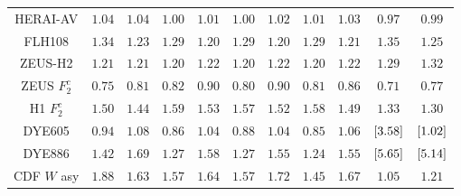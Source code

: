 \begin{tabular}{c||c|c||c|c||c|c||c|c||c|c}
 \hline
HERAI-AV            & $          1.04      $ & $          1.04      $  &  $          1.00      $  &  $          1.01      $  &  $         1.00      $ &  $         1.02      $ &  $          1.01      $  &  $          1.03      $  &  $          0.97      $  &  $          0.99      $  \\  
FLH108              & $          1.34      $ & $          1.23      $  &  $          1.29      $  &  $          1.20      $  &  $         1.29      $ &  $         1.20      $ &  $          1.29      $  &  $          1.21      $  &  $          1.35      $  &  $          1.25      $  \\  
ZEUS-H2             & $          1.21      $ & $          1.21      $  &  $          1.20      $  &  $          1.22      $  &  $         1.20      $ &  $         1.22      $ &  $          1.20      $  &  $          1.22      $  &  $          1.29      $  &  $          1.32      $  \\  
ZEUS $F_2^c$        & $          0.75      $ & $          0.81      $  &  $          0.82      $  &  $          0.90      $  &  $         0.80      $ &  $         0.90      $ &  $          0.81      $  &  $          0.86      $  &  $          0.71      $  &  $          0.77      $  \\  
H1 $F_2^c$          & $          1.50      $ & $          1.44      $  &  $          1.59      $  &  $          1.53      $  &  $         1.57      $ &  $         1.52      $ &  $          1.58      $  &  $          1.49      $  &  $          1.33      $  &  $          1.30      $  \\  
 \hline
DYE605              & $          0.94      $ & $          1.08      $  &  $          0.86      $  &  $          1.04      $  &  $         0.88      $ &  $         1.04      $ &  $          0.85      $  &  $          1.06      $  &  $  \left[     3.58 \right]  $  &  $  \left[     1.02 \right]  $  \\  
DYE886              & $          1.42      $ & $          1.69      $  &  $          1.27      $  &  $          1.58      $  &  $         1.27      $ &  $         1.55      $ &  $          1.24      $  &  $          1.55      $  &  $  \left[     5.65 \right]  $  &  $  \left[     5.14 \right]  $  \\  
 \hline
CDF $W$ asy         & $          1.88      $ & $          1.63      $  &  $          1.57      $  &  $          1.64      $  &  $         1.57      $ &  $         1.72      $ &  $          1.45      $  &  $          1.67      $  &  $          1.05      $  &  $          1.21      $  \\  

\end{tabular}

